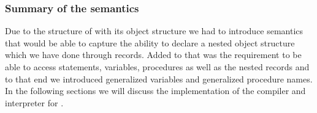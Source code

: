 
\subsubsection*{Summary of the semantics}
Due to the structure of \dazel{} with its object structure we had to introduce semantics that would be able to capture the ability to declare a nested object structure which we have done through records. Added to that was the requirement to be able to access statements, variables, procedures as well as the nested records and to that end we introduced generalized variables and generalized procedure names.
In the following sections we will discuss the implementation of the compiler and interpreter for \dazel{}. 
